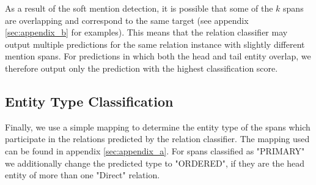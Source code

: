 \documentclass[11pt]{article}
\begin{document}
As a result of the soft mention detection, it is possible that some of the $k$ spans are overlapping and correspond to the same target (see appendix \ref{sec:appendix_b} for examples).
This means that the relation classifier may output multiple predictions for the same relation instance with slightly different mention spans. 
For predictions in which both the head and tail entity overlap, we therefore output only the prediction with the highest classification score.

\subsection{Entity Type Classification}

Finally, we use a simple mapping to determine the entity type of the spans which participate in the relations predicted by the relation classifier. 
The mapping used can be found in appendix \ref{sec:appendix_a}. For spans classified as "PRIMARY" we additionally change the predicted type to "ORDERED", if they are the head entity of more than one "Direct" relation.
\end{document}
